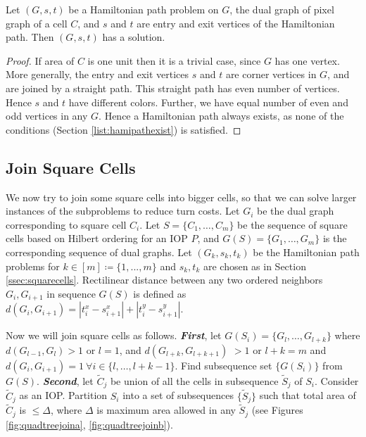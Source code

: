 \begin{lem}\label{lem:hamiltonianpathexist}
  Let $(G, s, t)$ be a Hamiltonian path problem on $G$, the dual graph of pixel graph of a cell $C$, and $s$ and $t$ are entry and exit vertices of the Hamiltonian path.
  Then $(G, s, t)$ has a solution.
\end{lem}
\begin{proof}
  If area of $C$ is one unit then it is a trivial case, since $G$ has one vertex.
  More generally, the entry and exit vertices $s$ and $t$ are corner vertices in $G$, and are joined by a straight path.
  This straight path has even number of vertices.
  Hence $s$ and $t$ have different colors.
  Further, we have equal number of even and odd vertices in any $G$.
  Hence a Hamiltonian path always exists, as none of the conditions (Section \ref{list:hamipathexist}) is satisfied.   
\end{proof}

\subsection{Join Square Cells}\label{ssec:joincell}

We now try to join some square cells into bigger cells, so that we can solve larger instances of the subproblems to reduce turn costs.
Let $G_i$ be the dual graph corresponding to square cell $C_i$.
Let $S = \{C_1, \dots, C_m\}$ be the sequence of square cells based on Hilbert ordering for an IOP $P$, and $G(S) = \{G_1, \dots, G_m\}$ is the  corresponding sequence of dual graphs.
Let $(G_k, s_k, t_k)$ be the Hamiltonian path problems for $k \in [m] \coloneq \{1, ... , m\}$ and $s_k, t_k$ are chosen as in Section \ref{ssec:squarecells}.
Rectilinear distance between any two ordered neighbors $G_i, G_{i+1}$ in sequence $G(S)$ is defined as $d(G_i,G_{i + 1}) = |t_i^x - s_{i+1}^x| + |t_i^y - s_{i+1}^y|$.

Now we will join square cells as follows.
{\bfseries{\textit{First}}}, let $G(S_i)= \{G_l, \dots, G_{l+k}\}$ where $d(G_{l-1},G_{l}) > 1$ or $l=1$, and $d(G_{l+k},G_{l+k+1})$ $>1$ or $l+k=m$ and $d(G_{i},G_{i+1})= 1 ~\forall i \in \{l, \dots, l+k-1\}$.
Find subsequence set $\{G(S_i)\}$ from $G(S)$.
{\bfseries{\textit{Second}}}, let $\tilde{C}_j$ be union of all the cells in subsequence $\tilde{S}_j$ of $S_i$.
Consider $\tilde{C}_j$ as an IOP.
Partition $S_i$ into a set of subsequences $\{\tilde{S}_j\}$ such that total area of $\tilde{C}_j$ is $\leq \Delta$, where $\Delta$ is maximum area allowed in any $\tilde{S}_j$ (see Figures \ref{fig:quadtreejoina}, \ref{fig:quadtreejoinb}).

